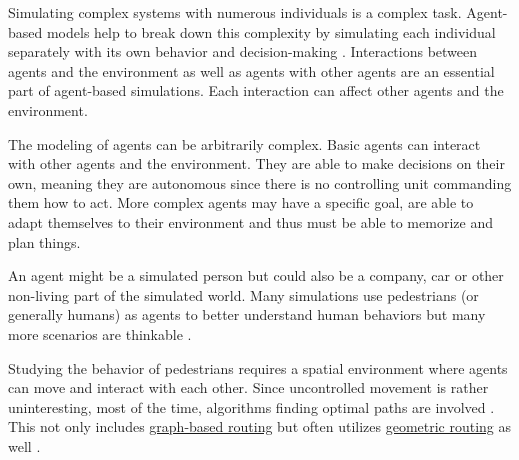 	Simulating complex systems with numerous individuals is a complex task.
	Agent-based models help to break down this complexity by simulating each individual separately with its own behavior and decision-making \cite{macal-introductory-tutorial}.
	Interactions between agents and the environment as well as agents with other agents are an essential part of agent-based simulations.
	Each interaction can affect other agents and the environment.
	
	The modeling of agents can be arbitrarily complex.
	Basic agents can interact with other agents and the environment.
	They are able to make decisions on their own, meaning they are autonomous since there is no controlling unit commanding them how to act.
	More complex agents may have a specific goal, are able to adapt themselves to their environment and thus must be able to memorize and plan things.
	
	An agent might be a simulated person but could also be a company, car or other non-living part of the simulated world.
	Many simulations use pedestrians (or generally humans) as agents to better understand human behaviors but many more scenarios are thinkable \cite{macal-introductory-tutorial}.

	Studying the behavior of pedestrians requires a spatial environment where agents can move and interact with each other.
	Since uncontrolled movement is rather uninteresting, most of the time, algorithms finding optimal paths are involved \cite{kneidl-borrmann-hartmann-navigation,gloor-hybrid-pedestrian-routing,teknomo-millonig-routing}.
	This not only includes \hyperref[sec:graph-routing]{graph-based routing} but often utilizes \hyperref[sec:geometric-routing]{geometric routing} as well \cite{kneidl-borrmann-hartmann-navigation}.
	
